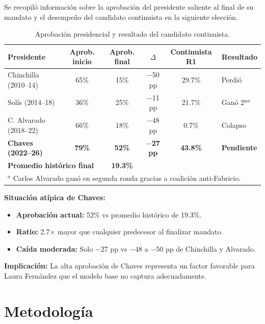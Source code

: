 \documentclass[11pt,a4paper]{article}
\begin{document}
Se recopiló información sobre la aprobación del presidente saliente al final de su mandato y el desempeño del candidato continuista en la siguiente elección.

\begin{table}[H]
\centering
\caption{Aprobación presidencial y resultado del candidato continuista.}
\label{tab:aprobacion}
\begin{tabular}{@{}lccccl@{}}
\toprule
\textbf{Presidente} & \textbf{Aprob. inicio} & \textbf{Aprob. final} & \textbf{$\Delta$} & \textbf{Continuista R1} & \textbf{Resultado} \\
\midrule
Chinchilla (2010--14) & 65\% & 15\% & $-$50 pp & 29.7\% & Perdió \\
Solís (2014--18) & 36\% & 25\% & $-$11 pp & 21.7\% & Ganó 2ª$^a$ \\
C. Alvarado (2018--22) & 66\% & 18\% & $-$48 pp & 0.7\% & Colapso \\
\textbf{Chaves (2022--26)} & \textbf{79\%} & \textbf{52\%} & \textbf{$-$27 pp} & \textbf{43.8\%} & \textbf{Pendiente} \\
\midrule
\multicolumn{2}{l}{\textbf{Promedio histórico final}} & \textbf{19.3\%} & & & \\
\bottomrule
\multicolumn{6}{l}{\footnotesize $^a$ Carlos Alvarado ganó en segunda ronda gracias a coalición anti-Fabricio.}
\end{tabular}
\end{table}

\textbf{Situación atípica de Chaves:}
\begin{itemize}
    \item \textbf{Aprobación actual:} 52\% vs promedio histórico de 19.3\%.
    \item \textbf{Ratio:} 2.7$\times$ mayor que cualquier predecesor al finalizar mandato.
    \item \textbf{Caída moderada:} Solo $-$27 pp vs $-$48 a $-$50 pp de Chinchilla y Alvarado.
\end{itemize}

\textbf{Implicación:} La alta aprobación de Chaves representa un factor favorable para Laura Fernández que el modelo base no captura adecuadamente.

\section{Metodología}
\end{document}

